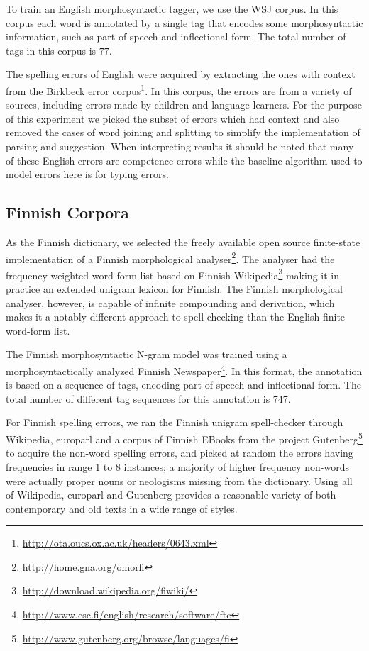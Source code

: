 \documentclass{llncs}
\begin{document}
To train an English morphosyntactic tagger, we use the WSJ corpus. In
this corpus each word is annotated by a single tag that encodes some
morphosyntactic information, such as part-of-speech and inflectional
form.  The total number of tags in this corpus is $77$.

The spelling errors of English were acquired by extracting the ones with
context from the Birkbeck error
corpus\footnote{\url{http://ota.oucs.ox.ac.uk/headers/0643.xml}}. In this
corpus, the errors are from a variety of sources, including errors made by
children and language-learners. For the purpose of this experiment we picked
the subset of errors which had context and also removed the cases of word
joining and splitting to simplify the implementation of parsing and suggestion.
When interpreting results it should be noted that many of these English errors
are competence errors while the baseline algorithm used to model errors here is
for typing errors.

\subsection{Finnish Corpora}

As the Finnish dictionary, we selected the freely available open source
finite-state implementation of a Finnish morphological
analyser\footnote{\url{http://home.gna.org/omorfi}}. The analyser had the
frequency-weighted word-form list based on Finnish
Wikipedia\footnote{\url{http://download.wikipedia.org/fiwiki/}} making it in
practice an extended unigram lexicon for Finnish. The Finnish morphological
analyser, however, is capable of infinite compounding and derivation, which
makes it a notably different approach to spell checking than the English finite
word-form list. 

The Finnish morphosyntactic N-gram model was trained using a
morphosyntactically analyzed Finnish
Newspaper\footnote{\url{http://www.csc.fi/english/research/software/ftc}}. In
this format, the annotation is based on a sequence of tags, encoding
part of speech and inflectional form. The total number of different
tag sequences for this annotation is 747.

For Finnish spelling errors, we ran the Finnish unigram spell-checker through
Wikipedia, europarl and a corpus of Finnish EBooks from the project
Gutenberg\footnote{\url{http://www.gutenberg.org/browse/languages/fi}} to
acquire the non-word spelling errors, and picked at random the errors having
frequencies in range 1 to 8 instances; a majority of higher frequency non-words
were actually proper nouns or neologisms missing from the dictionary. Using all of
Wikipedia, europarl and Gutenberg provides a reasonable variety of both
contemporary and old texts in a wide range of styles.
\end{document}
